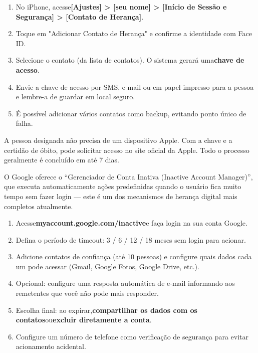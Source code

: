 \begin{enumerate}
  \item No iPhone, acesse\textbf{[Ajustes] > [seu nome] > [Início de Sessão e Segurança] > [Contato de Herança]}.
  \item Toque em "Adicionar Contato de Herança" e confirme a identidade com Face ID.
  \item Selecione o contato (da lista de contatos). O sistema gerará uma\textbf{chave de acesso}.
  \item Envie a chave de acesso por SMS, e-mail ou em papel impresso para a pessoa e lembre-a de guardar em local seguro.
  \item É possível adicionar vários contatos como backup, evitando ponto único de falha.
\end{enumerate}

A pessoa designada não precisa de um dispositivo Apple. Com a chave e a certidão de óbito, pode solicitar acesso no site oficial da Apple. Todo o processo geralmente é concluído em até 7 dias.


O Google oferece o “Gerenciador de Conta Inativa (Inactive Account Manager)”, que executa automaticamente ações predefinidas quando o usuário fica muito tempo sem fazer login — este é um dos mecanismos de herança digital mais completos atualmente.

\begin{enumerate}
  \item Acesse\textbf{myaccount.google.com/inactive}e faça login na sua conta Google.
  \item Defina o período de timeout: 3 / 6 / 12 / 18 meses sem login para acionar.
  \item Adicione contatos de confiança (até 10 pessoas) e configure quais dados cada um pode acessar (Gmail, Google Fotos, Google Drive, etc.).
  \item Opcional: configure uma resposta automática de e-mail informando aos remetentes que você não pode mais responder.
  \item Escolha final: ao expirar,\textbf{compartilhar os dados com os contatos}ou\textbf{excluir diretamente a conta}.
  \item Configure um número de telefone como verificação de segurança para evitar acionamento acidental.
\end{enumerate}


